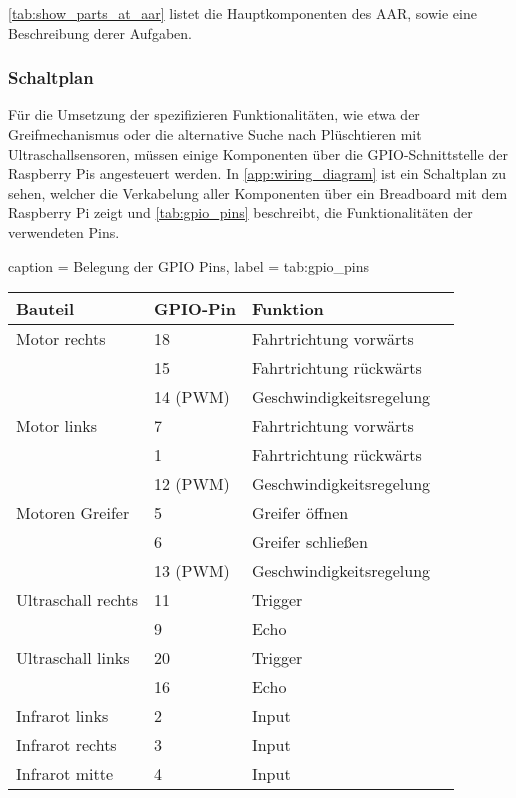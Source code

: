 \autoref{tab:show_parts_at_aar} listet die Hauptkomponenten des \ac{AAR}, sowie eine Beschreibung derer Aufgaben.

\subsubsection{Schaltplan}

Für die Umsetzung der spezifizieren Funktionalitäten, wie etwa der Greifmechanismus oder die alternative Suche nach Plüschtieren mit Ultraschallsensoren, müssen einige Komponenten über die \ac{GPIO}-Schnittstelle der Raspberry Pis angesteuert werden.
In \autoref{app:wiring_diagram} ist ein Schaltplan zu sehen, welcher die Verkabelung aller Komponenten über ein Breadboard mit dem Raspberry Pi zeigt und \autoref{tab:gpio_pins} beschreibt, die Funktionalitäten der verwendeten Pins.

\begin{dhbwtable}{%
    caption	= Belegung der GPIO Pins,
    label	= tab:gpio_pins
}
    \begin{tabular}{llll}
        \toprule
        \textbf{Bauteil} & \textbf{\ac{GPIO}-Pin} & \textbf{Funktion} \\\midrule
        Motor rechts   	    & 18        & Fahrtrichtung vorwärts\\
                            & 15        & Fahrtrichtung rückwärts\\
                            & 14 (PWM)  & Geschwindigkeitsregelung\\
        Motor links   	    & 7         & Fahrtrichtung vorwärts\\
                            & 1         & Fahrtrichtung rückwärts\\
                            & 12 (PWM)  & Geschwindigkeitsregelung\\    
        Motoren Greifer   	& 5         & Greifer öffnen\\
                            & 6         & Greifer schließen\\
                            & 13 (PWM)  & Geschwindigkeitsregelung\\
        Ultraschall rechts 	& 11        & Trigger\\
                            & 9         & Echo\\
        Ultraschall links   & 20        & Trigger\\
                            & 16        & Echo \\ 
        Infrarot links      & 2         & Input\\
        Infrarot rechts     & 3         & Input\\
        Infrarot mitte      & 4         & Input\\\bottomrule
    \end{tabular}    
\end{dhbwtable}
